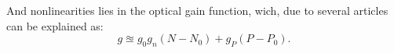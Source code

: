 And nonlinearities lies in the optical gain function, wich, due to several articles can be explained as:
\begin{equation}
	g \approxeq g_0 g_n(N-N_0) + g_P(P- P_0).
\end{equation}